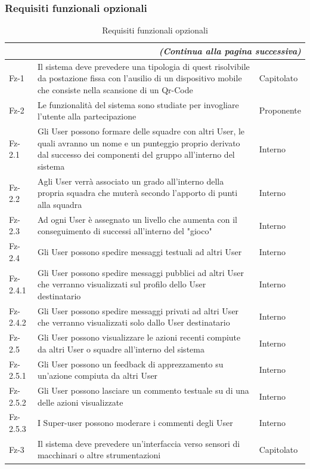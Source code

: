 {{\subsubsection{Requisiti funzionali opzionali}
\begin{longtable}{|p{}|p{}|p{}|}
\caption{Requisiti funzionali opzionali}\\
\hline
\endfirsthead
\multicolumn{3}{r}{\textit{(Continua alla pagina successiva)}}
\endfoot
\multicolumn{3}{l}{\textit{(Continua dalla pagina precedente)}}
\endhead
\hline
\endlastfoot
\textbf{Codice}& \textbf{Descrizione}& \textbf{Fonte}\\
\hline
Fz-1 & Il sistema deve prevedere una tipologia di quest risolvibile da postazione fissa con l'ausilio di un dispositivo mobile che consiste nella scansione di un Qr-Code & Capitolato\\
\hline
Fz-2 & Le funzionalità del sistema sono studiate per invogliare l'utente alla partecipazione & Proponente\\
\hline
Fz-2.1 & Gli User possono formare delle squadre con altri User, le quali avranno un nome e un punteggio proprio derivato dal successo dei componenti del gruppo all'interno del sistema & Interno\\
\hline
Fz-2.2 & Agli User verrà associato un grado all'interno della propria squadra che muterà secondo l'apporto di punti alla squadra & Interno\\
\hline
Fz-2.3 & Ad ogni User è assegnato un livello che aumenta con il conseguimento di successi all'interno del "gioco" & Interno\\
\hline
Fz-2.4 & Gli User possono spedire messaggi testuali ad altri User & Interno\\
\hline
Fz-2.4.1 & Gli User possono spedire messaggi pubblici ad altri User che verranno visualizzati sul profilo dello User destinatario & Interno\\
\hline
Fz-2.4.2 & Gli User possono spedire messaggi privati ad altri User che verranno visualizzati solo dallo User destinatario & Interno\\
\hline
Fz-2.5 & Gli User possono visualizzare le azioni recenti compiute da altri User o squadre all'interno del sistema & Interno\\
\hline
Fz-2.5.1 & Gli User possono un feedback di apprezzamento su un'azione compiuta da altri User & Interno\\
\hline
Fz-2.5.2 & Gli User possono lasciare un commento testuale su di una delle azioni visualizzate & Interno\\
\hline
Fz-2.5.3 & I Super-user possono moderare i commenti degli User & Interno\\
\hline
Fz-3 & Il sistema deve prevedere un'interfaccia verso sensori di macchinari o altre strumentazioni & Capitolato\\


\end{longtable}}}
